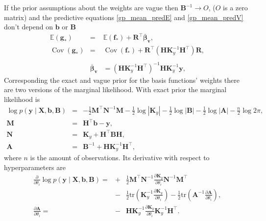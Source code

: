 \documentclass[twoside,11pt]{article}
\DeclareMathOperator{\COV}{Cov}
\begin{document}
% 
If the prior assumptions about the weights are vague then $\textbf{B}^{-1} \rightarrow O$, ($O$ is a zero matrix) and the predictive 
equations \eqref{gp_mean_predE} and \eqref{gp_mean_predV} don't depend on $\textbf{b}$ or $\textbf{B}$
% 
\begin{eqnarray}
  \label{gp_mean_predEvague}
  \mathbb{E(\textbf{g}_*)} &=& \mathbb{E(\textbf{f}_*)} + \textbf{R}^\top \boldsymbol{\overline{\beta}_v},\\
  \label{gp_mean_predVvague}\COV(\textbf{g}_*) &=& \COV(\textbf{f}_*) + \textbf{R}^\top\left( 
    \textbf{H}\textbf{K}_{y}^{-1}\textbf{H}^\top \right)\textbf{R},	\\
  \nonumber\\
  &\boldsymbol{\overline{\beta}_v}& = 
  \left(\textbf{H}\textbf{K}_y^{-1}\textbf{H}^\top \right)^{-1} 
  \textbf{H}\textbf{K}_y^{-1}\textbf{y}, \nonumber
\end{eqnarray}
% 
Corresponding the exact and vague prior for the basis functions' weights there are two versions of the marginal likelihood.
With exact prior the marginal likelihood is
% 
\begin{eqnarray}
  \log p(\textbf{y} \mid \textbf{X}, \textbf{b}, \textbf{B}) &=& -\frac{1}{2}\textbf{M}^\top \textbf{N}^{-1}\textbf{M} 
  -\frac{1}{2}\log|\textbf{K}_y|  -\frac{1}{2}\log|\textbf{B}|-\frac{1}{2}\log|\textbf{A}| -\frac{n}{2}\log 2\pi,\nonumber\\
  \textbf{M} &=& \textbf{H}^\top\textbf{b}-\textbf{y} ,\nonumber\\
  \textbf{N} &=& \textbf{K}_y  + \textbf{H}^\top \textbf{B}\textbf{H},\nonumber\\
  \textbf{A} &=& \textbf{B}^{-1} + \textbf{H}\textbf{K}_y^{-1}\textbf{H}^\top ,\nonumber
\end{eqnarray}
% 
where $n$ is the amount of observations. Its derivative with respect to hyperparameters are
% 
\begin{eqnarray}
  \frac{\partial }{\partial \theta_i} \log p(\textbf{y} \mid \textbf{X}, \textbf{b}, \textbf{B}) = &+&\frac{1}{2} 
  \textbf{M}^\top\textbf{N}^{-1}\frac{\partial \textbf{K}_y}{\partial \theta_i}\textbf{N}^{-1}\textbf{M}^\top \nonumber\\
  &-&\frac{1}{2}\text{tr}\left(\textbf{K}_y^{-1} \frac{\partial \textbf{K}_y}{\partial \theta_i}\right) - \frac{1}{2}\text{tr}\left(\textbf{A}^{-1} \frac{\partial \textbf{A}}{\partial \theta_i} \right), \nonumber\\
  \frac{\partial \textbf{A}}{\partial \theta_i} =&-&\textbf{H}\textbf{K}_y^{-1}\frac{\partial \textbf{K}_y}{\partial \theta_i}\textbf{K}_y^{-1}\textbf{H}^\top. 		\nonumber
\end{eqnarray}
\end{document}
